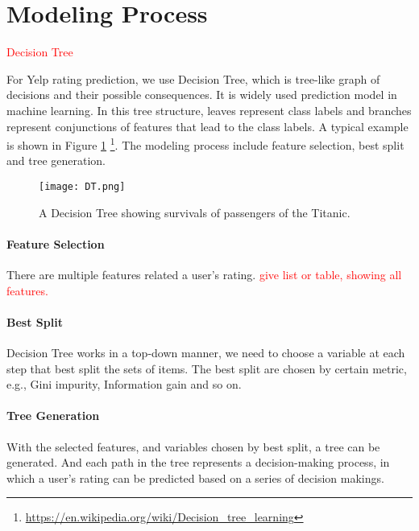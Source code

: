\section{Modeling Process}
\label{sec:modeling} 

\textcolor{red}{Decision Tree}

For Yelp rating prediction, we use Decision Tree, which is tree-like graph of decisions and their possible consequences. It is widely used prediction model in machine learning. In this tree structure, leaves represent class labels and branches represent conjunctions of features that lead to the class labels. A typical example is shown in Figure \ref{fig:DT} \footnote{\url{https://en.wikipedia.org/wiki/Decision_tree_learning}}. The modeling process include feature selection, best split and tree generation. 

\begin{figure}[h]
	\centering
	\texttt{[image: DT.png]}
	\caption{A Decision Tree showing survivals of passengers of the Titanic.}
	\label{fig:DT}
\end{figure}


\paragraph{Feature Selection}
There are multiple features related a user's rating. \textcolor{red}{give list or table, showing all features. }

\paragraph{Best Split}
Decision Tree works in a top-down manner, we need to choose a variable at each step that best split the sets of items. The best split are chosen by certain metric, e.g., Gini impurity, Information gain and so on. 

\paragraph{Tree Generation}
With the selected features, and variables chosen by best split, a tree can be generated. And each path in the tree represents a decision-making process, in which a user's rating can be predicted based on a series of decision makings. 